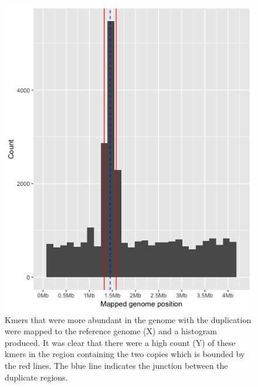 \documentclass{article}
\begin{document}
 \begin{figure}[h!]
\centering
\includegraphics[width=\textwidth]{Chapter_3/Kmer count dupe signal.png}
\caption{Kmers that were more abundant in the genome with the duplication were mapped to the reference genome (X) and a histogram produced. It was clear that there were a high count (Y) of these kmers in the region containing the two copies which is bounded by the red lines. The blue line indicates the junction between the duplicate regions.}
\label{fig:Kmer_abund_is_dece}
\end{figure}
\end{document}
